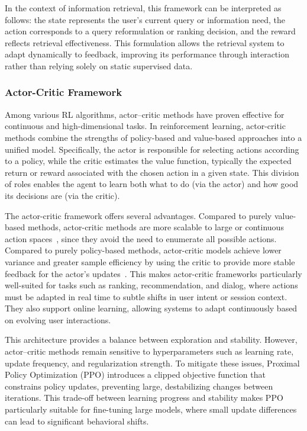 In the context of information retrieval, this framework can be interpreted as follows: the state represents the user’s current query or information need, the action corresponds to a query reformulation or ranking decision, and the reward reflects retrieval effectiveness. This formulation allows the retrieval system to adapt dynamically to feedback, improving its performance through interaction rather than relying solely on static supervised data.

\subsubsection{Actor-Critic Framework}
Among various RL algorithms, actor–critic methods have proven effective for continuous and high-dimensional tasks. In reinforcement learning, actor-critic methods combine the strengths of policy-based and value-based approaches into a unified model. Specifically, the actor is responsible for selecting actions according to a policy, while the critic estimates the value function, typically the expected return or reward associated with the chosen action in a given state. This division of roles enables the agent to learn both what to do (via the actor) and how good its decisions are (via the critic).

The actor-critic framework offers several advantages. Compared to purely value-based methods, actor-critic methods are more scalable to large or continuous action spaces~\cite{chen2019reinforcement, liu2018deep,chen2020knowledge}, since they avoid the need to enumerate all possible actions. Compared to purely policy-based methods, actor-critic models achieve lower variance and greater sample efficiency by using the critic to provide more stable feedback for the actor’s updates~\cite{sepliarskaia2021deep, chen2019reinforcement}. This makes actor-critic frameworks particularly well-suited for tasks such as ranking, recommendation, and dialog, where actions must be adapted in real time to subtle shifts in user intent or session context. They also support online learning, allowing systems to adapt continuously based on evolving user interactions. 

This architecture provides a balance between exploration and stability. However, actor–critic methods remain sensitive to hyperparameters such as learning rate, update frequency, and regularization strength. To mitigate these issues, Proximal Policy Optimization (PPO) introduces a clipped objective function that constrains policy updates, preventing large, destabilizing changes between iterations. This trade-off between learning progress and stability makes PPO particularly suitable for fine-tuning large models, where small update differences can lead to significant behavioral shifts.

